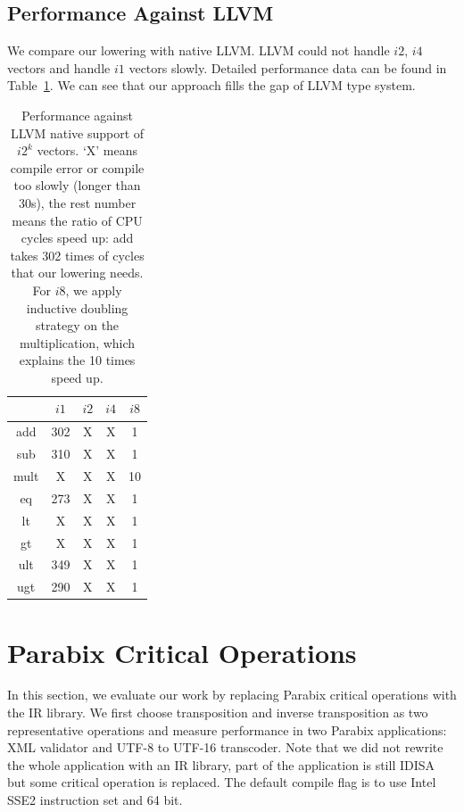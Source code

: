 \subsection{Performance Against LLVM}
We compare our lowering with native LLVM\@. LLVM could not handle $i2$, $i4$ vectors and handle $i1$ vectors slowly. Detailed performance data can be found in Table~\ref{table:vector_perf_LLVM}. We can see that our approach fills the gap of LLVM type system.

\begin{table}[h]
\centering
\begin{tabular}{|c|c|c|c|c|}
\hline
     & $i1$ & $i2$ & $i4$ & $i8$ \\ \hline
add  & 302  & X    & X    & 1\\ \hline
sub  & 310  & X    & X    & 1\\ \hline
mult & X    & X    & X    & 10\\ \hline
eq   & 273  & X    & X    & 1\\ \hline
lt   & X    & X    & X    & 1\\ \hline
gt   & X    & X    & X    & 1\\ \hline
ult  & 349  & X    & X    & 1\\ \hline
ugt  & 290  & X    & X    & 1\\ \hline
\end{tabular}
\caption[Performance against LLVM native support for $i2^k$ vectors]{Performance against LLVM native support of $i2^k$ vectors. `X' means compile error or compile too slowly (longer than 30s), the rest number means the ratio of CPU cycles speed up: add takes 302 times of cycles that our lowering needs. For $i8$, we apply inductive doubling strategy on the multiplication, which explains the 10 times speed up. }
\label{table:vector_perf_LLVM}
\end{table}

\section{Parabix Critical Operations}
In this section, we evaluate our work by replacing Parabix critical operations with the IR library. We first choose transposition and inverse transposition as two representative operations and measure performance in two Parabix applications: XML validator and UTF-8 to UTF-16 transcoder. Note that we did not rewrite the whole application with an IR library, part of the application is still IDISA but some critical operation is replaced. The default compile flag is to use Intel SSE2 instruction set and 64 bit.

